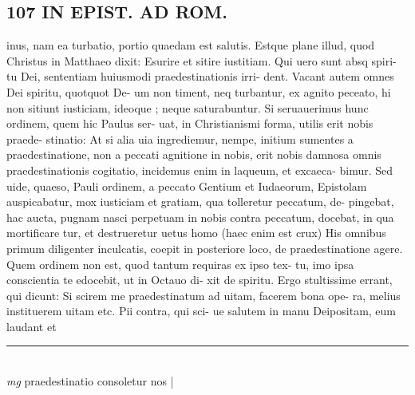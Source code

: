 \documentclass{article}
\begin{document}
\begin{pages}
\section*{107 IN EPIST. AD ROM.  }
\marginpar{[ p.]}\pstart inus, nam ea turbatio, portio quaedam est salutis.  Estque plane illud, quod Christus in Matthaeo dixit: Esurire et sitire iustitiam. Qui uero sunt absq spiri- tu Dei, sententiam huiusmodi praedestinationis irri- dent. Vacant autem omnes Dei spiritu, quotquot De- um non timent, neq turbantur, ex agnito peceato, hi non sitiunt iusticiam, ideoque ; neque saturabuntur.  Si seruauerimus hunc ordinem, quem hic Paulus ser- uat, in Christianismi forma, utilis erit nobis praede- stinatio: At si alia uia ingrediemur, nempe, initium sumentes a praedestinatione, non a peccati agnitione in nobis, erit nobis damnosa omnis praedestinationis cogitatio, incidemus enim in laqueum, et excaeca- bimur. Sed uide, quaeso, Pauli ordinem, a peccato Gentium et Iudaeorum, Epistolam auspicabatur, mox iusticiam et gratiam, qua tolleretur peccatum, de- pingebat, hac aucta, pugnam nasci perpetuam in nobis contra peccatum, docebat, in qua mortificare tur, et destrueretur uetus homo (haec enim est crux) His omnibus primum diligenter inculcatis, coepit in posteriore loco, de praedestinatione agere. Quem ordinem non est, quod tantum requiras ex ipso tex- tu, imo ipsa conscientia te edocebit, ut in Octauo di- xit de spiritu. Ergo stultissime errant, qui dicunt: Si scirem me praedestinatum ad uitam, facerem bona ope- ra, melius instituerem uitam etc. Pii contra, qui sci- ue salutem in manu Deipositam, eum laudant et  \pend
\vspace{0.5cm}\noindent
\vspace{0.2cm}\rule{1cm}{0.2pt}\\ 
\hspace{0.2cm}\textit{mg}
\footnotesize praedestinatio consoletur nos 
\normalsize| 

\end{pages}
\end{document}
